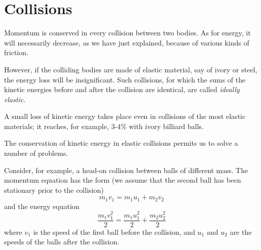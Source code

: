 \section{Collisions}
Momentum is conserved in every collision between two
bodies. As for energy, it will necessarily decrease, as we
have just explained, because of various kinds of friction.

However, if the colliding bodies are made of elastic
material, say of ivory or steel, the energy loss will be
insignificant. Such collisions, for which the sums of the
kinetic energies before and after the collision are identical, are called \emph{ideally elastic}.

A small loss of kinetic energy takes place even in collisions of the most elastic materials; it reaches, for example,
3-4\% with ivory billiard balls.

The conservation of kinetic energy in elastic collisions
permits us to solve a number of problems.

Consider, for example, a head-on collision between
balls of different mass. The momentum equation has the
form (we assume that the second ball has been stationary prior to the collision)
\begin{equation*}%
m_{1}v_{1} = m_{1}u_{1} + m_{2}v_{2}
\end{equation*}
and the energy equation
\begin{equation*}%
\frac{m_{1}v_{1}^{2}}{2} = \frac{m_{1}u_{1}^{2}}{2} +\frac{m_{2}u_{2}^{2}}{2}
\end{equation*}
where $v_{1}$ is the speed of the first ball before the collision,
and $u_{1}$ and $u_{2}$ are the speeds of the balls after the collision.

